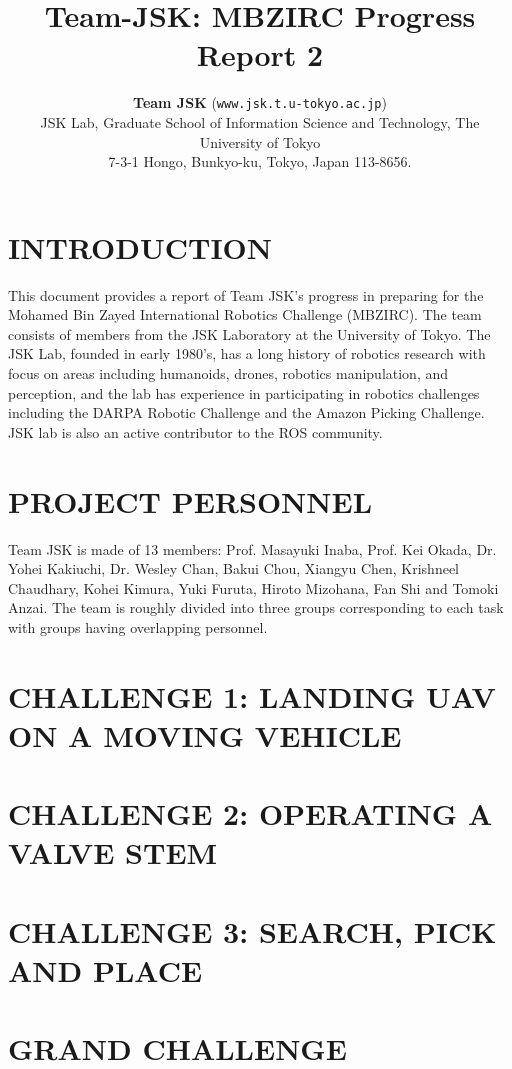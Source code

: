 \documentclass[letterpaper, 10 pt, conference]{ieeeconf}  %
\title{\LARGE \bf
  Team-JSK: MBZIRC Progress Report 2
}
\author{\textbf{Team JSK} ({\texttt{www.jsk.t.u-tokyo.ac.jp}})%
  \\ JSK Lab, Graduate School of Information Science and Technology,
  The University of Tokyo \\
  7-3-1 Hongo, Bunkyo-ku, Tokyo, Japan 113-8656.  \\
}
\begin{document}
\maketitle
\thispagestyle{empty}
\pagestyle{empty}


\section{INTRODUCTION}
This document provides a report of Team JSK's progress in preparing
for the Mohamed Bin Zayed International Robotics Challenge
(MBZIRC). The team consists of members from the JSK Laboratory at the
University of Tokyo. The JSK Lab, founded in early 1980’s, has a long
history of robotics research with focus on areas including humanoids,
drones, robotics manipulation, and perception, and the lab has
experience in participating in robotics challenges including the DARPA
Robotic Challenge and the Amazon Picking Challenge. JSK lab is also an
active contributor to the ROS community.


\section{PROJECT PERSONNEL}
Team JSK is made of 13 members: Prof. Masayuki Inaba, Prof. Kei
Okada, Dr. Yohei Kakiuchi, Dr. Wesley Chan, Bakui Chou, Xiangyu Chen,
Krishneel Chaudhary, Kohei Kimura, Yuki Furuta, Hiroto
Mizohana, Fan Shi and Tomoki Anzai. The team is roughly divided into
three groups corresponding to each task with groups having overlapping
personnel.

\section{CHALLENGE 1: LANDING UAV ON A MOVING VEHICLE}




\section{CHALLENGE 2: OPERATING A VALVE STEM}


\section{CHALLENGE 3: SEARCH, PICK AND PLACE}


\section{GRAND CHALLENGE}


\end{document}
